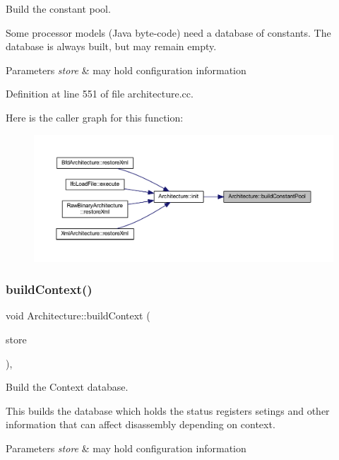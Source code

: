 Build the constant pool. 

Some processor models (Java byte-\/code) need a database of constants. The database is always built, but may remain empty. 
\begin{DoxyParams}{Parameters}
{\em store} & may hold configuration information \\
\hline
\end{DoxyParams}


Definition at line 551 of file architecture.\+cc.

Here is the caller graph for this function\+:
\nopagebreak
\begin{figure}[H]
\begin{center}
\leavevmode
\includegraphics[width=350pt]{class_architecture_aed8aa1186293e453601bedb0db3d4ec1_icgraph}
\end{center}
\end{figure}
\mbox{\label{class_architecture_a9a2fd38d4d08155637ebee1e043fd9a8}} 
\subsubsection{\texorpdfstring{buildContext()}{buildContext()}}
{\footnotesize\ttfamily void Architecture\+::build\+Context (\begin{DoxyParamCaption}\item[{\mbox{\hyperlink{class_document_storage}{Document\+Storage}} \&}]{store }\end{DoxyParamCaption})\hspace{0.3cm}{\ttfamily [protected]}, {\ttfamily [virtual]}}



Build the Context database. 

This builds the database which holds the status registers setings and other information that can affect disassembly depending on context. 
\begin{DoxyParams}{Parameters}
{\em store} & may hold configuration information \\
\hline
\end{DoxyParams}


